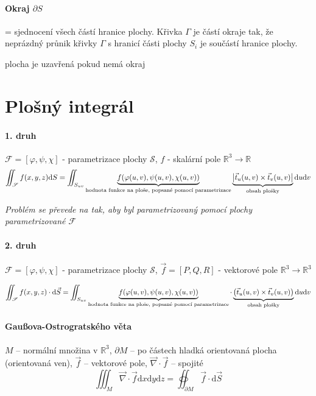 \documentclass[a4paper, twoside,%
12pt]{article}
\newcommand{\dif}{\mathrm{d}}
\newcommand{\R}{\mathbb{R}}
\newcommand{\F}{\mathscr{F}}
\begin{document}
\paragraph{Okraj $\partial S$} = sjednocení všech částí hranice plochy. Křivka $\Gamma $ je částí okraje tak, že neprázdný průnik křivky $\Gamma$ s hranicí části plochy $S_i$ je součástí hranice plochy.

plocha je uzavřená pokud nemá okraj

\section{Plošný integrál}

\paragraph{1. druh} $\F = [\varphi, \psi, \chi]$ - parametrizace plochy $\mathscr{S}$, $f$ - skalární pole $\R^3 \to \R $
$$ \iint_\mathscr{S} f(x,y,z)\dif S = \iint_{S_{uv}} \underbrace{f(\varphi(u,v), \psi(u,v), \chi(u,v))}_{\text{hodnota funkce na ploše,}\linebreak \text{ popsané pomocí parametrizace}} \underbrace{\left| \vec t_u (u,v) \times \vec t_v (u,v) \right|}_{\text{obsah plošky}}\dif u \dif v $$

\emph{Problém se převede na tak, aby byl parametrizovaný pomocí plochy parametrizované $\F$}

\paragraph{2. druh} $\F = [\varphi, \psi, \chi]$ - parametrizace plochy $\mathscr{S}$, $\vec f = [P,Q,R]$ - vektorové pole $\R^3 \to \R^3 $

$$ \iint_\mathscr{S} f(x,y,z)\cdot \dif \vec S = \iint_{S_{uv}} \underbrace{f(\varphi(u,v), \psi(u,v), \chi(u,v))}_{\text{hodnota funkce na ploše,}\linebreak \text{ popsané pomocí parametrizace}} \cdot \underbrace{\left( \vec t_u (u,v) \times \vec t_v (u,v) \right)}_{\text{obsah plošky}}\dif u \dif v $$

\paragraph{Gaußova-Ostrogratského věta} $M$ -- normální množina v $\R^3$, $\partial M$ -- po částech hladká orientovaná plocha (orientovaná ven), $\vec{f}$ -- vektorové pole, $\vec{\nabla}\cdot \vec{f}$ -- spojité
$$\iiint_M \vec{\nabla}\cdot \vec{f} \dif x \dif y \dif z = \oiint_{\partial M} \vec{f}\cdot \dif \vec{S} $$
\end{document}
